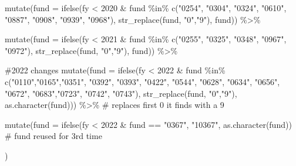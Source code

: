 \documentclass[
  letterpaper,
  DIV=11,
  numbers=noendperiod]{scrreport}
\newenvironment{Shaded}{\begin{snugshade}}{\end{snugshade}}
\newcommand{\AttributeTok}[1]{\textcolor[rgb]{0.40,0.45,0.13}{#1}}
\newcommand{\CommentTok}[1]{\textcolor[rgb]{0.37,0.37,0.37}{#1}}
\newcommand{\DecValTok}[1]{\textcolor[rgb]{0.68,0.00,0.00}{#1}}
\newcommand{\FunctionTok}[1]{\textcolor[rgb]{0.28,0.35,0.67}{#1}}
\newcommand{\NormalTok}[1]{\textcolor[rgb]{0.00,0.23,0.31}{#1}}
\newcommand{\SpecialCharTok}[1]{\textcolor[rgb]{0.37,0.37,0.37}{#1}}
\newcommand{\StringTok}[1]{\textcolor[rgb]{0.13,0.47,0.30}{#1}}
\begin{document}
\begin{Shaded}
\begin{Highlighting}[]
  \FunctionTok{mutate}\NormalTok{(}\AttributeTok{fund =}  \FunctionTok{ifelse}\NormalTok{(fy }\SpecialCharTok{\textless{}} \DecValTok{2020} \SpecialCharTok{\&}\NormalTok{ fund }\SpecialCharTok{\%in\%} \FunctionTok{c}\NormalTok{(}\StringTok{"0254"}\NormalTok{, }\StringTok{"0304"}\NormalTok{, }\StringTok{"0324"}\NormalTok{, }\StringTok{"0610"}\NormalTok{, }\StringTok{"0887"}\NormalTok{, }\StringTok{"0908"}\NormalTok{, }\StringTok{"0939"}\NormalTok{, }\StringTok{"0968"}\NormalTok{), }\FunctionTok{str\_replace}\NormalTok{(fund, }\StringTok{"0"}\NormalTok{,}\StringTok{"9"}\NormalTok{), fund)) }\SpecialCharTok{\%\textgreater{}\%}

  \FunctionTok{mutate}\NormalTok{(}\AttributeTok{fund =}  \FunctionTok{ifelse}\NormalTok{(fy }\SpecialCharTok{\textless{}} \DecValTok{2021} \SpecialCharTok{\&}\NormalTok{ fund }\SpecialCharTok{\%in\%} \FunctionTok{c}\NormalTok{(}\StringTok{"0255"}\NormalTok{, }\StringTok{"0325"}\NormalTok{, }\StringTok{"0348"}\NormalTok{, }\StringTok{"0967"}\NormalTok{, }\StringTok{"0972"}\NormalTok{), }\FunctionTok{str\_replace}\NormalTok{(fund, }\StringTok{"0"}\NormalTok{,}\StringTok{"9"}\NormalTok{), fund))  }\SpecialCharTok{\%\textgreater{}\%}
  
  \CommentTok{\#2022 changes}
  \FunctionTok{mutate}\NormalTok{(}\AttributeTok{fund =} \FunctionTok{ifelse}\NormalTok{(fy }\SpecialCharTok{\textless{}} \DecValTok{2022} \SpecialCharTok{\&}\NormalTok{ fund }\SpecialCharTok{\%in\%} \FunctionTok{c}\NormalTok{(}\StringTok{"0110"}\NormalTok{,}\StringTok{"0165"}\NormalTok{,}\StringTok{"0351"}\NormalTok{, }\StringTok{"0392"}\NormalTok{, }\StringTok{"0393"}\NormalTok{, }\StringTok{"0422"}\NormalTok{, }\StringTok{"0544"}\NormalTok{, }\StringTok{"0628"}\NormalTok{, }\StringTok{"0634"}\NormalTok{,  }\StringTok{"0656"}\NormalTok{, }\StringTok{"0672"}\NormalTok{, }\StringTok{"0683"}\NormalTok{,}\StringTok{"0723"}\NormalTok{, }\StringTok{"0742"}\NormalTok{, }\StringTok{"0743"}\NormalTok{), }\FunctionTok{str\_replace}\NormalTok{(fund, }\StringTok{"0"}\NormalTok{,}\StringTok{"9"}\NormalTok{), }\FunctionTok{as.character}\NormalTok{(fund))) }\SpecialCharTok{\%\textgreater{}\%}  \CommentTok{\# replaces first 0 it finds with a 9}

  \FunctionTok{mutate}\NormalTok{(}\AttributeTok{fund =} \FunctionTok{ifelse}\NormalTok{(fy }\SpecialCharTok{\textless{}} \DecValTok{2022} \SpecialCharTok{\&}\NormalTok{ fund }\SpecialCharTok{==} \StringTok{"0367"}\NormalTok{, }\StringTok{"10367"}\NormalTok{, }\FunctionTok{as.character}\NormalTok{(fund)) }\CommentTok{\# fund reused for 3rd time }

\NormalTok{  )}
\end{Highlighting}
\end{Shaded}
\end{document}
